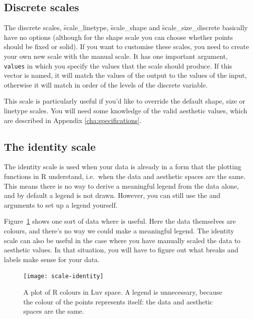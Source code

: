 \subsection{Discrete scales}
\label{sub:scale-discrete}

The discrete scales, \f{scale_linetype}, \f{scale_shape} and \f{scale_size_discrete} basically have no options (although for the shape scale you can choose whether points should be fixed or solid).  If you want to customise these scales, you need to create your own new scale with the manual scale.  It has one important argument, \verb|values| in which you specify the values that the scale should produce.  If this vector is named, it will match the values of the output to the values of the input, otherwise it will match in order of the levels of the discrete variable.  

This scale is particularly useful if you'd like to override the default shape, size or linetype scales.  You will need some knowledge of the valid aesthetic values, which are described in Appendix \ref{cha:specifications}.

\subsection{The identity scale}
\label{sub:scale-identity}

The identity scale is used when your data is already in a form that the plotting functions in R understand, i.e.\ when the data and aesthetic spaces are the same.  This means there is no way to derive a meaningful legend from the data alone, and by default a legend is not drawn.  However, you can still use the  and  arguments to set up a legend yourself.

Figure~\ref{fig:scale-identity} shows one sort of data where  is useful.  Here the data themselves are colours, and there's no way we could make a meaningful legend.  The identity scale can also be useful in the case where you have manually scaled the data to aesthetic values.  In that situation, you will have to figure out what breaks and labels make sense for your data.

\begin{figure}[htbp]
  \centering
    \texttt{[image: scale-identity]}
  \caption{A plot of R colours in Luv space.  A legend is unnecessary, because the colour of the points represents itself: the data and aesthetic spaces are the same.}
  \label{fig:scale-identity}
\end{figure}

